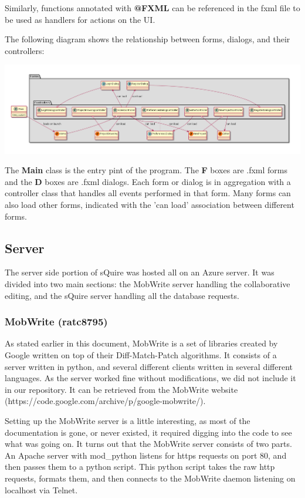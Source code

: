 \documentclass[twoside,letterpaper]{article}
\begin{document}
Similarly, functions annotated with \textbf{@FXML} can be referenced in the fxml file to be used as handlers for actions on the UI.

\newpage

The following diagram shows the relationship between forms, dialogs, and their controllers:

\begin{center}
	\includegraphics[scale=0.4]{images/Implementation/Diagram.png}
\end{center}

The \textbf{Main} class is the entry pint of the program. The \textbf{F} boxes are .fxml forms and the \textbf{D} boxes are .fxml dialogs. Each form or dialog is in aggregation with a controller class that handles all events performed in that form. Many forms can also load other forms, indicated with the 'can load' association between different forms.


\newpage
\subsection{Server}
The server side portion of sQuire was hosted all on an Azure server. It was divided into two main sections: the MobWrite server handling the collaborative editing, and the sQuire server handling all the database requests.

\subsubsection{MobWrite (ratc8795)}
As stated earlier in this document, MobWrite is a set of libraries created by Google written on top of their Diff-Match-Patch algorithms. It consists of a server written in python, and several different clients written in several different languages. As the server worked fine without modifications, we did not include it in our repository. It can be retrieved from the MobWrite website (https://code.google.com/archive/p/google-mobwrite/).

Setting up the MobWrite server is a little interesting, as most of the documentation is gone, or never existed, it required digging into the code to see what was going on. It turns out that the MobWrite server consists of two parts. An Apache server with mod\_python listens for https requests on port 80, and then passes them to a python script. This python script takes the raw http requests, formats them, and then connects to the MobWrite daemon listening on localhost via Telnet.
\end{document}
